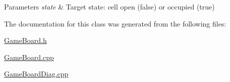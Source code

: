 \begin{DoxyParams}{Parameters}
{\em state} & Target state\-: cell open (false) or occupied (true) \\
\hline
\end{DoxyParams}


The documentation for this class was generated from the following files\-:\begin{DoxyCompactItemize}
\item 
\hyperlink{_game_board_8h}{Game\-Board.\-h}\item 
\hyperlink{_game_board_8cpp}{Game\-Board.\-cpp}\item 
\hyperlink{_game_board_diag_8cpp}{Game\-Board\-Diag.\-cpp}\end{DoxyCompactItemize}
